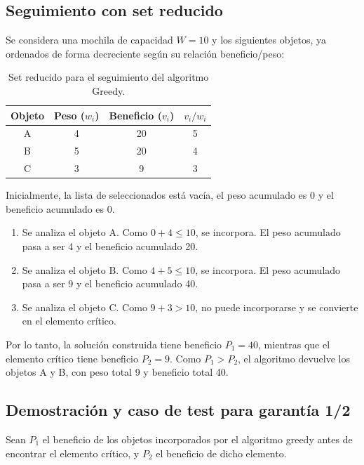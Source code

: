 \documentclass[11pt,a4paper]{article}
\begin{document}
\subsection{Seguimiento con set reducido}

Se considera una mochila de capacidad $W=10$ y los siguientes objetos,
ya ordenados de forma decreciente según su relación beneficio/peso:

\begin{table}[h]
    \centering
    \begin{tabular}{cccc}
        \toprule
        \textbf{Objeto} & \textbf{Peso ($w_i$)} & \textbf{Beneficio ($v_i$)} & \textbf{$v_i/w_i$} \\
        \midrule
        A & 4 & 20 & 5 \\
        B & 5 & 20 & 4 \\
        C & 3 & 9 & 3 \\
        \bottomrule
    \end{tabular}
    \caption{Set reducido para el seguimiento del algoritmo Greedy.}
\end{table}

Inicialmente, la lista de seleccionados está vacía, el peso acumulado es 0
y el beneficio acumulado es 0.

\begin{enumerate}
    \item Se analiza el objeto A. Como $0+4 \leq 10$, se incorpora.
    El peso acumulado pasa a ser 4 y el beneficio acumulado 20.

    \item Se analiza el objeto B. Como $4+5 \leq 10$, se incorpora.
    El peso acumulado pasa a ser 9 y el beneficio acumulado 40.

    \item Se analiza el objeto C. Como $9+3 > 10$, no puede incorporarse
    y se convierte en el elemento crítico.
\end{enumerate}

Por lo tanto, la solución construida tiene beneficio $P_1=40$, mientras que
el elemento crítico tiene beneficio $P_2=9$. Como $P_1 > P_2$, el algoritmo
devuelve los objetos A y B, con peso total 9 y beneficio total 40.

\subsection{Demostración y caso de test para garantía 1/2}

Sean $P_1$ el beneficio de los objetos incorporados por el algoritmo greedy
antes de encontrar el elemento crítico, y $P_2$ el beneficio de dicho elemento.
\end{document}
